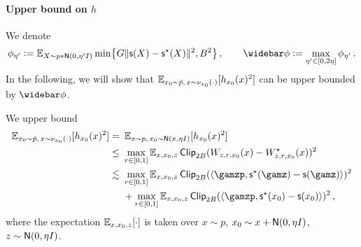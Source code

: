 \paragraph{Upper bound on $h$}
We denote
\begin{align}\label{pfeq:sc-err-capped}
    \begin{aligned}
    \phi_{\eta'}\ldef \En_{X\sim \pconv{\eta'}} \minc{ G \nrm{\scf(X)-\scfs(X)}^2, B^2}\,, \qquad \phibar\ldef \max_{\eta'\in[0,2\eta]}\phi_{\eta'}\,.
\end{aligned}
\end{align}
In the following, we will show that $\operatorname{\mathbb{E}}_{x_0\sim \breve p,\, x\sim \nu_{x_0}(\cdot)}[h_{x_0}(x)^2]$ can be upper bounded by $\phibar$.

We upper bound
\begin{align*}
    \En_{\xz\sim \breve p,\, x\sim \piz{\cdot}}[h_{\xz}(x)^2]
    =&~ \En_{x\sim p,\, \xz\sim \normal{x,\eta I}}[h_{\xz}(x)^2] \\
    \leq&~ \max_{r\in [0,1]}\En_{x,\xz,z}\pclip[2B]{\epxz-\epsxz}^2 \\
    \lesssim &~ \max_{r\in [0,1]}\En_{x,\xz,z} \pclip[2B]{\tri{\gamzp, \scfs(\gamz)-\scf(\gamz)}}^2 \\
    &~+\max_{r\in [0,1]}\En_{x,\xz,z} \pclip[2B]{\tri{\gamzp, \scfs(\xz)-\scf(\xz)}}^2\,,
\end{align*}
where the expectation $\operatorname{\mathbb{E}}_{x,x_0,z}[\cdot]$ is taken over $x\sim p$, $\xz\sim x+\Neta$, $z\sim \normal{0,\eta\Id}$. 

